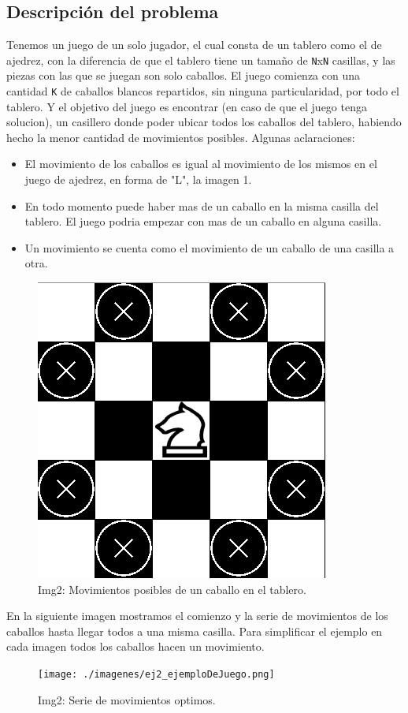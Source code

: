 \subsection{Descripci\'on del problema}

Tenemos un juego de un solo jugador, el cual consta de un tablero como el de ajedrez, con la diferencia de que el tablero tiene un tamaño de \texttt{N}x\texttt{N} casillas, y las piezas con las que se juegan son solo caballos. El juego comienza con una cantidad \texttt{K} de caballos blancos repartidos, sin ninguna particularidad, por todo el tablero. Y el objetivo del juego es encontrar (en caso de que el juego tenga solucion), un casillero donde poder ubicar todos los caballos del tablero, habiendo hecho la menor cantidad de movimientos posibles. 
Algunas aclaraciones:
\begin{itemize}
\item El movimiento de los caballos es igual al movimiento de los mismos en el juego de ajedrez, en forma de "L", la imagen 1.
\item En todo momento puede haber mas de un caballo en la misma casilla del tablero. El juego podria empezar con mas de un caballo en alguna casilla.
\item Un movimiento se cuenta como el movimiento de un caballo de una casilla a otra.
\end{itemize}

\begin{figure}[H]
\begin{center}
\includegraphics[scale=.45]{./imagenes/ej2_movimientoCaballo.png}
\caption{Img2: Movimientos posibles de un caballo en el tablero.}
\end{center}
\end{figure}

En la siguiente imagen mostramos el comienzo y la serie de movimientos de los caballos hasta llegar todos a una misma casilla. Para simplificar el ejemplo en cada imagen todos los caballos hacen un movimiento.

\begin{figure}[H]
\begin{center}
\texttt{[image: ./imagenes/ej2\_ejemploDeJuego.png]}
\caption{Img2: Serie de movimientos optimos.}
\end{center}
\end{figure}


\newpage